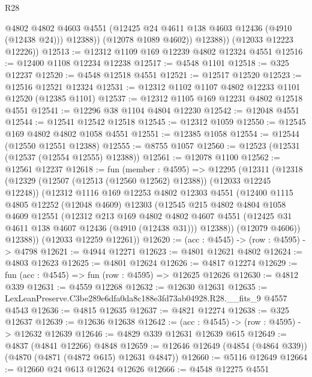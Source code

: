 \begin{lexlean}{R28}
\begin{coremodule}
                @4802
                @4802
                @4603
                @4551
                (@12425 @24 @4611 @138 @4603 @12436 (@4910 (@12438 @24)))
                @12388))
            (@12078 @1089 @4602))
          @12388))
      (@12033 @12223 @12226))
@12513 := @12312 @1109 @169 @12239 @4802 @12324 @4551
@12516 := @12400 @1108 @12234 @12238
@12517 := @4548 @1101
@12518 := @325 @12237
@12520 := @4548 @12518 @4551
@12521 := @12517 @12520
@12523 := @12516 @12521 @12324
@12531 := @12312 @1102 @1107 @4802 @12233 @1101 @12520 (@12385 @1101)
@12537 := @12312 @1105 @169 @12231 @4802 @12518 @4551
@12541 := @12296 @38 @1104 @4804 @12230
@12542 := @12048 @4551
@12544 := @12541 @12542 @12518
@12545 := @12312 @1059
@12550 := @12545 @169 @4802 @4802 @1058 @4551
@12551 := @12385 @1058
@12554 := @12544 (@12550 @12551 @12388)
@12555 := @8755 @1057
@12560 := @12523 (@12531 (@12537 (@12554 @12555) @12388))
@12561 := @12078 @1100
@12562 := @12561 @12237
@12618 := fun (member : @4595) =>
  @12295
    (@12311
      (@12318
        (@12329 (@12507 (@12513 (@12560 @12562) @12388)) (@12033 @12245 @12248))
        (@12312
          @1116
          @169
          @12253
          @4802
          @12303
          @4551
          (@12400
            @1115
            @4805
            @12252
            (@12048 @4609)
            @12303
            (@12545
              @215
              @4802
              @4804
              @1058
              @4609
              @12551
              (@12312
                @213
                @169
                @4802
                @4802
                @4607
                @4551
                (@12425 @31 @4611 @138 @4607 @12436 (@4910 (@12438 @31)))
                @12388))
            (@12079 @4606))
          @12388))
      (@12033 @12259 @12261))
@12620 := (acc : @4545) -> (row : @4595) -> @4798
@12621 := @4944 @12271
@12623 := @4801 @12621 @4802
@12624 := @4803 @12623
@12625 := @4801 @12624
@12626 := @4817 @12274
@12629 := fun (acc : @4545) => fun (row : @4595) => @12625 @12626
@12630 := @4812 @339
@12631 := @4559 @12268
@12632 := @12630 @12631
@12635 := LexLeanPreserve.C3be289e6dfa0da8c188e3fd73ab04928.R28.__fits_9 @4557 @4543
@12636 := @4815 @12635
@12637 := @4821 @12274
@12638 := @325 @12637
@12639 := @12636 @12638
@12642 := (acc : @4545) -> (row : @4595) -> @12632 @12639
@12646 := @4829 @339 @12631 @12639 @615
@12649 := @4837 (@4841 @12266) @4848
@12659 := @12646 @12649 (@4854 (@4864 @339)) (@4870 (@4871 (@4872 @615) @12631 @4847))
@12660 := @5116 @12649
@12664 := @12660 @24 @613 @12624 @12626
@12666 := @4548 @12275 @4551

\end{coremodule}
\end{lexlean}
